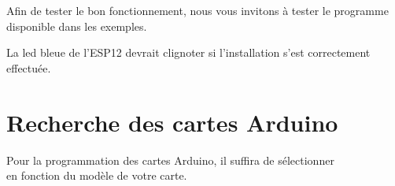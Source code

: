Afin de tester le bon fonctionnement, nous vous invitons à tester le programme  disponible dans les exemples.


La led bleue de l'ESP12 devrait clignoter si l'installation s'est correctement effectuée.

\section{Recherche des cartes Arduino}

Pour la programmation des cartes Arduino, il suffira de sélectionner \\
 en fonction du modèle de votre carte.


